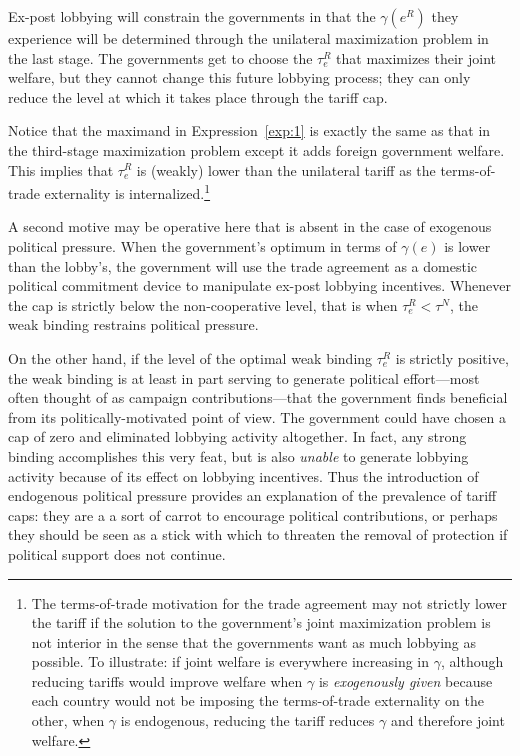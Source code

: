\documentclass[12pt,titlepage]{article}
\newcommand{\ga}{\gamma}
\begin{document}
Ex-post lobbying will constrain the governments in that the $\ga\left(e^R\right)$ they experience will be determined through the unilateral maximization problem in the last stage. The governments get to choose the $\tau_e^R$ that maximizes their joint welfare, but they cannot change this future lobbying process; they can only reduce the level at which it takes place through the tariff cap.

Notice that the maximand in Expression~\ref{exp:1} is exactly the same as that in the third-stage maximization problem except it adds  foreign government welfare. This implies that $\tau_e^R$ is (weakly) lower than the unilateral tariff as the terms-of-trade externality is internalized.\footnote{The terms-of-trade motivation for the trade agreement may not strictly lower the tariff if the solution to the government's joint maximization problem is not interior in the sense that the governments want as much lobbying as possible. To illustrate: if joint welfare is everywhere increasing in $\ga$, although reducing tariffs would improve welfare when $\ga$ is \textit{exogenously given} because each country would not be imposing the terms-of-trade externality on the other, when $\ga$ is endogenous, reducing the tariff reduces $\ga$ and therefore joint welfare.\label{fn:tot}}

A second motive may be operative here that is absent in the case of exogenous political pressure. When the government's optimum in terms of $\ga(e)$ is lower than the lobby's, the government will use the trade agreement as a domestic political commitment device to manipulate ex-post lobbying incentives. Whenever the cap is strictly below the non-cooperative level, that is when $\tau_e^R < \tau^N$, the weak binding restrains political pressure.

On the other hand, if the level of the optimal weak binding $\tau_e^R$ is strictly positive, the weak binding is at least in part serving to generate political effort---most often thought of as campaign contributions---that the government finds beneficial from its politically-motivated point of view. The government could have chosen a cap of zero and eliminated lobbying activity altogether. In fact, any strong binding accomplishes this very feat, but is also \textit{unable} to generate lobbying activity because of its effect on lobbying incentives. Thus the introduction of endogenous political pressure provides an explanation of the prevalence of tariff caps: they are a a sort of carrot to encourage political contributions, or perhaps they should be seen as a stick with which to threaten the removal of protection if political support does not continue.
\end{document}
